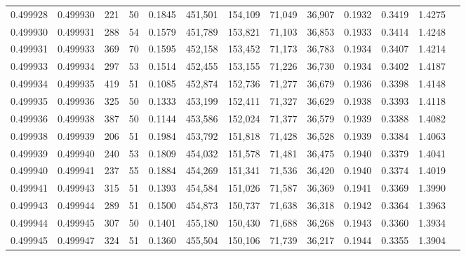 \begin{tabular}{rrrrrrrrrrrrr}
0.499928 & 0.499930 & 221 &  50 &                                     0.1845 & 451,501 & 154,109 &  71,049 &  36,907 & 0.1932 & 0.3419 & 1.4275 \\
0.499930 & 0.499931 & 288 &  54 &                                     0.1579 & 451,789 & 153,821 &  71,103 &  36,853 & 0.1933 & 0.3414 & 1.4248 \\
0.499931 & 0.499933 & 369 &  70 &                                     0.1595 & 452,158 & 153,452 &  71,173 &  36,783 & 0.1934 & 0.3407 & 1.4214 \\
0.499933 & 0.499934 & 297 &  53 &                                     0.1514 & 452,455 & 153,155 &  71,226 &  36,730 & 0.1934 & 0.3402 & 1.4187 \\
0.499934 & 0.499935 & 419 &  51 &                                     0.1085 & 452,874 & 152,736 &  71,277 &  36,679 & 0.1936 & 0.3398 & 1.4148 \\
0.499935 & 0.499936 & 325 &  50 &                                     0.1333 & 453,199 & 152,411 &  71,327 &  36,629 & 0.1938 & 0.3393 & 1.4118 \\
0.499936 & 0.499938 & 387 &  50 &                                     0.1144 & 453,586 & 152,024 &  71,377 &  36,579 & 0.1939 & 0.3388 & 1.4082 \\
0.499938 & 0.499939 & 206 &  51 &                                     0.1984 & 453,792 & 151,818 &  71,428 &  36,528 & 0.1939 & 0.3384 & 1.4063 \\
0.499939 & 0.499940 & 240 &  53 &                                     0.1809 & 454,032 & 151,578 &  71,481 &  36,475 & 0.1940 & 0.3379 & 1.4041 \\
0.499940 & 0.499941 & 237 &  55 &                                     0.1884 & 454,269 & 151,341 &  71,536 &  36,420 & 0.1940 & 0.3374 & 1.4019 \\
0.499941 & 0.499943 & 315 &  51 &                                     0.1393 & 454,584 & 151,026 &  71,587 &  36,369 & 0.1941 & 0.3369 & 1.3990 \\
0.499943 & 0.499944 & 289 &  51 &                                     0.1500 & 454,873 & 150,737 &  71,638 &  36,318 & 0.1942 & 0.3364 & 1.3963 \\
0.499944 & 0.499945 & 307 &  50 &                                     0.1401 & 455,180 & 150,430 &  71,688 &  36,268 & 0.1943 & 0.3360 & 1.3934 \\
0.499945 & 0.499947 & 324 &  51 &                                     0.1360 & 455,504 & 150,106 &  71,739 &  36,217 & 0.1944 & 0.3355 & 1.3904 \\

\end{tabular}
